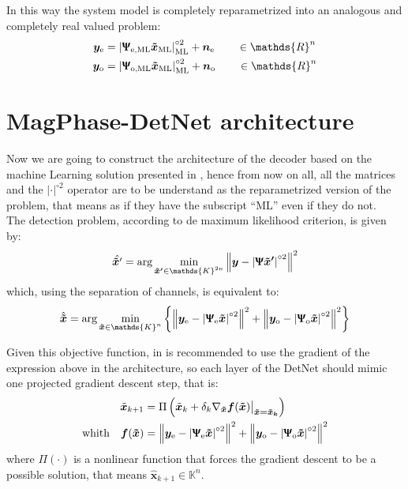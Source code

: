 In this way the system model is completely reparametrized into an analogous and completely real valued problem:
\begin{align}
	\bm y_\text{e} &= \left|\bm{\Uppsi_\text{e,ML}\tilde{x}_\text{ML} } \right|^{\circ2}_\text{ML}+\bm n_\text{e}\qquad\in\mathds{R}^n\\
	\bm y_\text{o} &= \left|\bm{\Uppsi_\text{o,ML}\tilde{x}_\text{ML} } \right|^{\circ2}_\text{ML}+\bm n_\text{o}\qquad\in\mathds{R}^n
\end{align}



\section{MagPhase-DetNet architecture}

Now we are going to construct the architecture of the decoder based on the machine Learning solution presented in \cite{Neev_2019}, hence from now on all, all the matrices and the $|\cdot|^{\circ2}$ operator are to be understand as the reparametrized version of the problem, that means as if they have the subscript ``ML'' even if they do not.\\

The detection problem, according to de maximum likelihood criterion, is given by:
\begin{align}
	\hat{\bm{\tilde{x}}'} = \arg \min_{\bm{\tilde{x}'} \in \mathds{K}^{2n}} \left\lVert \bm y - \left|\bm{\Uppsi}\bm{\tilde{x}'}  \right|^{\circ2}\right\rVert^2
\end{align}
which, using the separation of channels, is equivalent to:
\begin{align}
	\hat{\bm{\tilde{x}}} = \arg \min_{\bm{\tilde{x}} \in \mathds{K}^{n}}\left\{ \left\lVert \bm y_\text{e} - \left|\bm{\Uppsi}_\text{e}\bm{\tilde{x}}  \right|^{\circ2}\right\rVert^2+\left\lVert \bm y_\text{o} - \left|\bm{\Uppsi}_\text{o}\bm{\tilde{x}}  \right|^{\circ2}\right\rVert^2\right\}
\end{align}

Given this objective function, in \cite{Neev_2019} is recommended to use the gradient of the expression above in the architecture, so each layer of the DetNet should mimic one projected gradient descent step, that is:
\begin{align*}
	\tilde{\bm x}_{k+1}&=\Pi\left(\tilde{\bm x}_{k}+\delta_k \nabla_{\bm{\tilde{x}}}\bm{f}(\bm{\tilde{x}}) \bigr|_{\bm{\tilde{x}=\tilde{x}_k}}\right)\\
	\text{whith}\quad \bm{f}(\bm{\tilde{x}})&=\left\lVert \bm y_\text{e} - \left|\bm{\Uppsi}_\text{e}\bm{\tilde{x}}  \right|^{\circ2}\right\rVert^2+\left\lVert \bm y_\text{o} - \left|\bm{\Uppsi}_\text{o}\bm{\tilde{x}}  \right|^{\circ2}\right\rVert^2
\end{align*}
where $\Pi(\cdot)$ is a nonlinear function that forces the gradient descent to be a possible solution, that means $\hat{\bm x}_{k+1}\in \mathds{K}^n$.\\


